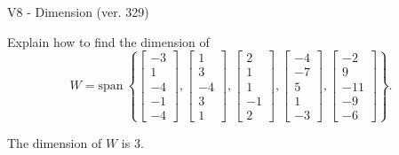 \begin{exercise}
  \begin{exerciseTitle}V8 - Dimension (ver. 329)\end{exerciseTitle}
  \begin{exerciseStatement}
    Explain how to find the dimension of 
\[W=\mathrm{span}\ \left\{\left[\begin{array}{r}
-3 \\
1 \\
-4 \\
-1 \\
-4
\end{array}\right] , \left[\begin{array}{r}
1 \\
3 \\
-4 \\
3 \\
1
\end{array}\right] , \left[\begin{array}{r}
2 \\
1 \\
1 \\
-1 \\
2
\end{array}\right] , \left[\begin{array}{r}
-4 \\
-7 \\
5 \\
1 \\
-3
\end{array}\right] , \left[\begin{array}{r}
-2 \\
9 \\
-11 \\
-9 \\
-6
\end{array}\right]\right\}.\]



  \end{exerciseStatement}
  \begin{exerciseAnswer}
   The dimension of \(W\) is  \(3\).
  


  \end{exerciseAnswer}
\end{exercise}